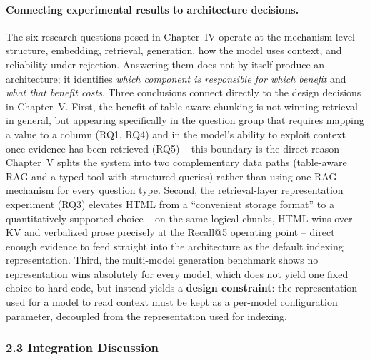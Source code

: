 \documentclass[11pt,a4paper]{article}
\begin{document}
\paragraph{Connecting experimental results to architecture decisions.}
The six research questions posed in Chapter~IV operate at the mechanism
level -- structure, embedding, retrieval, generation, how the model uses
context, and reliability under rejection. Answering them does not by itself
produce an architecture; it identifies \emph{which component is responsible
for which benefit} and \emph{what that benefit costs}. Three conclusions
connect directly to the design decisions in Chapter~V. First, the benefit of
table-aware chunking is not winning retrieval in general, but appearing
specifically in the question group that requires mapping a value to a
column (RQ1, RQ4) and in the model's ability to exploit context once
evidence has been retrieved (RQ5) -- this boundary is the direct reason
Chapter~V splits the system into two complementary data paths (table-aware
RAG and a typed tool with structured queries) rather than using one RAG
mechanism for every question type. Second, the retrieval-layer
representation experiment (RQ3) elevates HTML from a ``convenient storage
format'' to a quantitatively supported choice -- on the same logical chunks,
HTML wins over KV and verbalized prose precisely at the Recall@5 operating
point -- direct enough evidence to feed straight into the architecture as
the default indexing representation. Third, the multi-model generation
benchmark shows no representation wins absolutely for every model, which
does not yield one fixed choice to hard-code, but instead yields a
\textbf{design constraint}: the representation used for a model to read
context must be kept as a per-model configuration parameter, decoupled from
the representation used for indexing.

\subsubsection{2.3 Integration Discussion}
\end{document}
